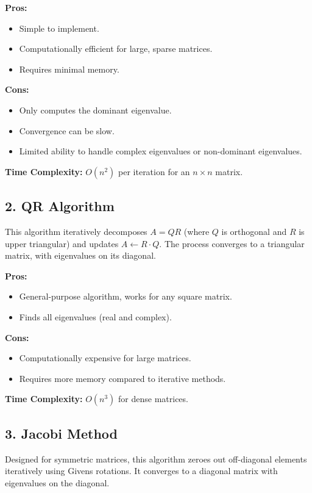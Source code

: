 \documentclass[12pt]{article}
\begin{document}
\textbf{Pros:}
\begin{itemize}
    \item Simple to implement.
    \item Computationally efficient for large, sparse matrices.
    \item Requires minimal memory.
\end{itemize}

\textbf{Cons:}
\begin{itemize}
    \item Only computes the dominant eigenvalue.
    \item Convergence can be slow.
    \item Limited ability to handle complex eigenvalues or non-dominant eigenvalues.
\end{itemize}

\textbf{Time Complexity:} \( O(n^2) \) per iteration for an \( n \times n \) matrix.

\subsection*{\textcolor{subheadercolor}{2. QR Algorithm}}
\tcolorbox[colback=tableheadercolor!10, colframe=tablebordercolor, sharp corners=all, title=\textbf{Method}]
This algorithm iteratively decomposes \( A = QR \) (where \( Q \) is orthogonal and \( R \) is upper triangular) and updates \( A \leftarrow R \cdot Q \). The process converges to a triangular matrix, with eigenvalues on its diagonal.
\endtcolorbox

\textbf{Pros:}
\begin{itemize}
    \item General-purpose algorithm, works for any square matrix.
    \item Finds all eigenvalues (real and complex).
\end{itemize}

\textbf{Cons:}
\begin{itemize}
    \item Computationally expensive for large matrices.
    \item Requires more memory compared to iterative methods.
\end{itemize}

\textbf{Time Complexity:} \( O(n^3) \) for dense matrices.

\subsection*{\textcolor{subheadercolor}{3. Jacobi Method}}
\tcolorbox[colback=tableheadercolor!10, colframe=tablebordercolor, sharp corners=all, title=\textbf{Method}]
Designed for symmetric matrices, this algorithm zeroes out off-diagonal elements iteratively using Givens rotations. It converges to a diagonal matrix with eigenvalues on the diagonal.
\endtcolorbox
\end{document}
